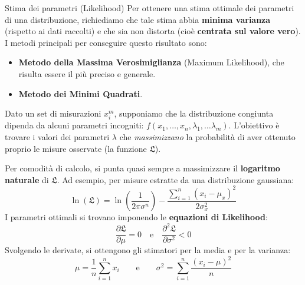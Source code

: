 \documentclass[openany,a4paper,12pt]{book}
\theoremstyle{remark}
\begin{document}
\begin{bressan}{Stima dei parametri (Likelihood)}
Per ottenere una stima ottimale dei parametri di una distribuzione, richiediamo che tale stima abbia \textbf{minima varianza} (rispetto ai dati raccolti) e che sia non distorta (cioè \textbf{centrata sul valore vero}). I metodi principali per conseguire questo risultato sono:
\begin{itemize}
    \item \textbf{Metodo della Massima Verosimiglianza} (Maximum Likelihood), che risulta essere il più preciso e generale.
    \item \textbf{Metodo dei Minimi Quadrati}.
\end{itemize}

Dato un set di misurazioni $x_i^m$, supponiamo che la distribuzione congiunta dipenda da alcuni parametri incogniti: $f(x_1, \dots, x_n, \lambda_1, \dots \lambda_m)$. L'obiettivo è trovare i valori dei parametri $\lambda$ che \textit{massimizzano} la probabilità di aver ottenuto proprio le misure osservate (la funzione $\mathfrak{L}$).

Per comodità di calcolo, si punta quasi sempre a massimizzare il \textbf{logaritmo naturale} di $\mathfrak{L}$. Ad esempio, per misure estratte da una distribuzione gaussiana:
\begin{equation*}
    \ln(\mathfrak{L}) = \ln\left(\frac{1}{2\pi\sigma^n}\right) - \frac{\sum_{i=1}^n (x_i - \mu_x)^2}{2\sigma_x^2}
\end{equation*}
I parametri ottimali si trovano imponendo le \textbf{equazioni di Likelihood}:
\begin{equation*}
    \frac{\partial \mathfrak{L}}{\partial \mu} = 0 \quad \text{e} \quad \frac{\partial^2 \mathfrak{L}}{\partial \sigma^2} < 0
\end{equation*}
Svolgendo le derivate, si ottengono gli stimatori per la media e per la varianza:
\begin{equation*} 
    \mu = \frac{1}{n} \sum_{i=1}^n x_i \qquad \text{e} \qquad \sigma^2 = \sum_{i=1}^n \frac{(x_i-\mu)^2}{n} 
\end{equation*}


\end{bressan}
\end{document}
